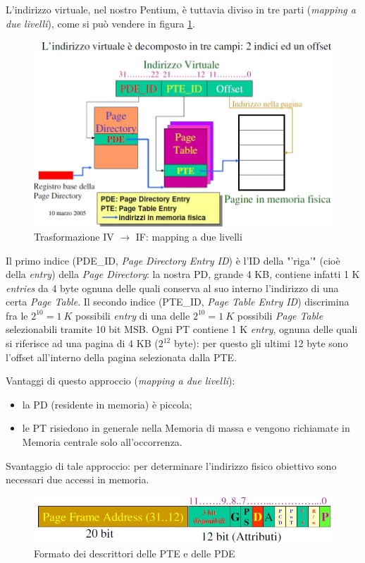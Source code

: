 L'indirizzo virtuale, nel nostro Pentium, è tuttavia diviso in tre parti (\textit{mapping a due livelli}), come si può vendere in figura \ref{fig:3parti}.

\begin{figure}[!h]
\centering
\includegraphics[width=0.87\columnwidth]{img/3parti}
\caption{Trasformazione IV $\to$ IF: mapping a due livelli}
\label{fig:3parti}
\end{figure}

Il primo indice (PDE\_ID, \textit{Page Directory Entry ID}) è l'ID della "'riga'" (cioè della \textit{entry}) della \textit{Page Directory}: la nostra PD, grande 4 KB, contiene infatti 1 K \textit{entries} da 4 byte ognuna delle quali conserva al suo interno l'indirizzo di una certa \textit{Page Table}. Il secondo indice (PTE\_ID, \textit{Page Table Entry ID}) discrimina fra le $2^{10} = 1 ~K$ possibili \textit{entry} di una delle $2^{10} = 1 ~K$ possibili \textit{Page Table} selezionabili tramite 10 bit MSB. Ogni PT contiene 1 K \textit{entry}, ognuna delle quali si riferisce ad una pagina di 4 KB ($2^{12}$ byte): per questo gli ultimi 12 byte sono l'offset all'interno della pagina selezionata dalla PTE.

Vantaggi di questo approccio (\textit{mapping a due livelli}):
\begin{itemize}
\item la PD (residente in memoria) è piccola;
\item le PT risiedono in generale nella Memoria di massa e vengono richiamate in Memoria centrale solo all'occorrenza.
\end{itemize}
Svantaggio di tale approccio: per determinare l'indirizzo fisico obiettivo sono necessari due accessi in memoria.

\begin{figure}[!h]
\centering
\includegraphics[width=0.75\columnwidth]{img/ptepde}
\caption{Formato dei descrittori delle PTE e delle PDE}
\label{fig:ptepde}
\end{figure}


